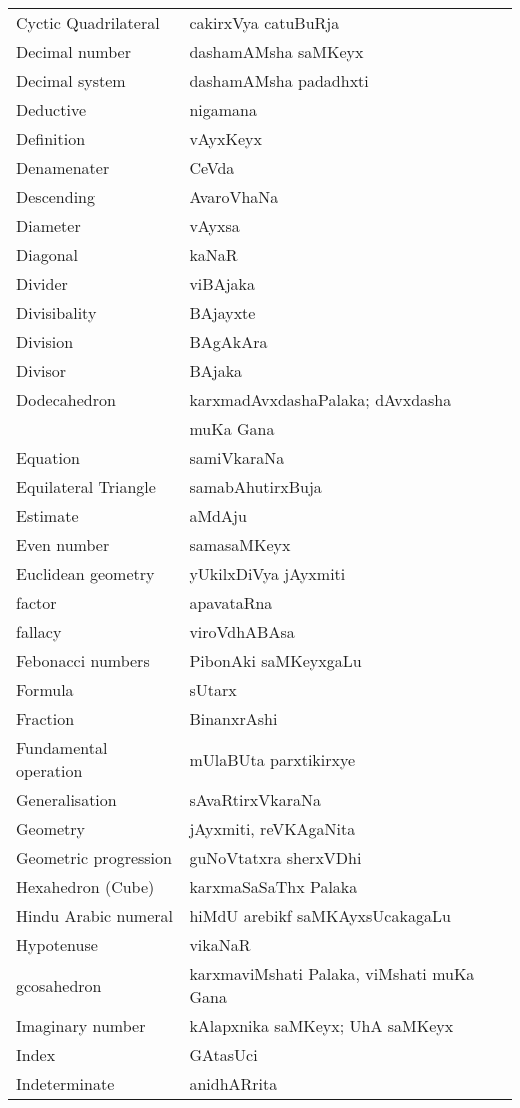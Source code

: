 \begin{longtable}{>{\rm}l@{\hspace{1cm}}l}
Cyctic Quadrilateral & cakirxVya catuBuRja\\
Decimal number & dashamAMsha saMKeyx\\
Decimal system & dashamAMsha padadhxti\\
Deductive & nigamana\\
Definition & vAyxKeyx\\
Denamenater & CeVda\\
Descending & AvaroVhaNa\\
Diameter & vAyxsa\\
Diagonal & kaNaR\\
Divider & viBAjaka\\
Divisibality & BAjayxte\\
Division & BAgAkAra\\
Divisor & BAjaka\\
Dodecahedron & karxmadAvxdashaPalaka; dAvxdasha\\[-0.1cm]
& muKa Gana\\
Equation & samiVkaraNa\\
Equilateral Triangle & samabAhutirxBuja\\
Estimate & aMdAju\\
Even number & samasaMKeyx\\
Euclidean geometry & yUkilxDiVya jAyxmiti\\
factor & apavataRna\\
fallacy & viroVdhABAsa\\
Febonacci numbers & PibonAki saMKeyxgaLu\\
Formula & sUtarx\\
Fraction & BinanxrAshi\\
Fundamental operation & mUlaBUta parxtikirxye\\
Generalisation & sAvaRtirxVkaraNa\\
Geometry & jAyxmiti, reVKAgaNita\\
Geometric progression & guNoVtatxra sherxVDhi\\
Hexahedron (Cube) & karxmaSaSaThx Palaka\\
Hindu Arabic numeral & hiMdU arebikf saMKAyxsUcakagaLu\\
Hypotenuse & vikaNaR\\
gcosahedron & karxmaviMshati Palaka, viMshati muKa Gana\\
Imaginary number  & kAlapxnika saMKeyx; UhA saMKeyx\\
Index & GAtasUci\\
Indeterminate & anidhARrita\\

\end{longtable}
